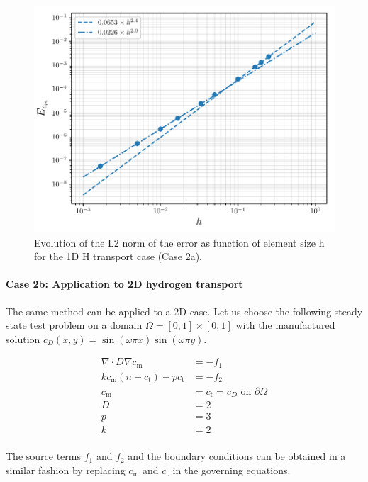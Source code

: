 \begin{figure}
    \centering
    \includegraphics[width=1\linewidth]{"Figures/Chapter3/L2 error on Cm vs h"}
    \caption{Evolution of the L2 norm of the error as function of element size h for the 1D H transport case (Case 2a).}
    \label{fig:error vs h}
\end{figure}

\paragraph{Case 2b: Application to 2D hydrogen transport}


The same method can be applied to a 2D case.
Let us choose the following steady state test problem on a domain $\Omega = [0, 1] \times [0, 1]$ with the manufactured solution $c_D(x, y) = \sin(\omega \pi x) \sin(\omega \pi y)$.

\begin{align}
    \nabla \cdot D \nabla c_\mathrm{m} &= -f_1 \\
    k c_\mathrm{m} (n - c_\mathrm{t}) - p c_\mathrm{t} &= -f_2 \\
    c_\mathrm{m} &= c_\mathrm{t} = c_D \text{  on  } \partial \Omega \\
    D &= 2 \\
    p &= 3 \\
    k &= 2 \\
\end{align}

The source terms $f_1$ and $f_2$ and the boundary conditions can be obtained in a similar fashion by replacing $c_\mathrm{m}$ and $c_\mathrm{t}$ in the governing equations.

